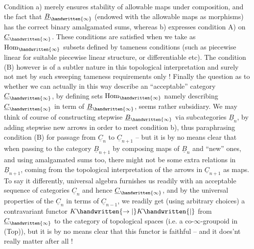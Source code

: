 Condition a) merely ensures stability of allowable maps under composition, and the fact that $\underline{B}_{\handwritten{\infty}}$ (endowed with the allowable maps as morphisms) has the correct binary amalgamated sums, whereas b) expresses condition A) on $\underline{C}_{\handwritten{\infty}}$. These conditions are satisfied when we take as $\operatorname{Hom}_{\handwritten{\infty}}$ subsets defined by tameness conditions (such as piecewise linear for suitable piecewise linear structure, or differentiable etc). The condition (B) however is of a subtler nature in this topological interpretation and surely not met by such sweeping tameness requirements only ! Finally the question as to whether we can actually in this way describe an ``acceptable'' category $\underline{C}_{\handwritten{\infty}}$, by defining sets $\operatorname{Hom}_{\handwritten{\infty}}$ namely describing $\underline{C}_{\handwritten{\infty}}$ in term of $\underline{B}_{\handwritten{\infty}}$, seems rather subsidiary. We may think of course of constructing stepwise $\underline{B}_{\handwritten{\infty}}$ via subcategories $\underline{B}_n$, by adding stepwise new arrows in order to meet condition b), thus paraphrasing condition (B) for passage  from $\underline{C}_n$ to $\underline{C}_{n+1}$ -- but it is by no means clear that when passing to the category $\underline{B}_{n+1}$ by composing  maps of $\underline{B}_n$ and ``new'' ones, and using amalgamated sums too, there might not be some  extra relations  in $\underline{B}_{n+1}$, coming from the topological interpretation of the arrows in $\underline{C}_{n+1}$ as maps. To say it differently, universal algebra furnishes us readily with an acceptable sequence of categories $\underline{C}_n$ and hence $\underline{C}_{\handwritten{\infty}}$, and by the universal properties of the $\underline{C}_n$ in terms of $\underline{C}_{n-1}$, we readily get (using arbitrary choices) a contravariant functor $K\handwritten{\to|}K\handwritten{|}$ from $\underline{C}_{\handwritten{\infty}}$ to the category of topological spaces (i.e. a co-$\infty$-groupoid in (Top)), but it is by no means clear that this functor is faithful -- and it does'nt really matter after all !

